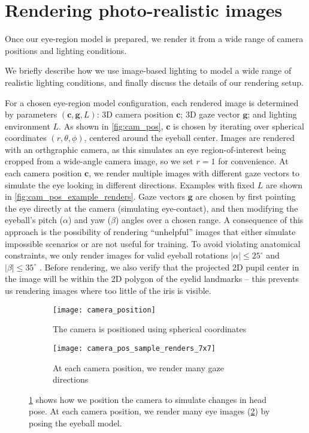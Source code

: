 
\section{Rendering photo-realistic images}

Once our eye-region model is prepared, we render it from a wide range of camera positions and lighting conditions.

We briefly describe how we use image-based lighting \cite{debevec2002image} to model a wide range of realistic lighting conditions, and finally discuss the details of our rendering setup.

For a chosen eye-region model configuration, each rendered image is determined by parameters $(\mathbf{c}, \mathbf{g}, L)$: 3D camera position $\mathbf{c}$; 3D gaze vector $\mathbf{g}$; and lighting environment $L$. As shown in \autoref{fig:cam_pos}, $\mathbf{c}$ is chosen by iterating over spherical coordinates $(r, \theta, \phi)$, centered around the eyeball center. Images are rendered with an orthgraphic camera, as this simulates an eye region-of-interest being cropped from a wide-angle camera image, so we set $r\!=\!1$ for convenience. At each camera position $\mathbf{c}$, we render multiple images with different gaze vectors to simulate the eye looking in different directions. Examples with fixed $L$ are shown in \autoref{fig:cam_pos_example_renders}. Gaze vectors $\mathbf{g}$ are chosen by first pointing the eye directly at the camera (simulating eye-contact), and then modifying the eyeball's pitch ($\alpha$) and yaw ($\beta$) angles over a chosen range.
%
A consequence of this approach is the possibility of rendering ``unhelpful'' images that either simulate impossible scenarios or are not useful for training. To avoid violating anatomical constraints, we only render images for valid eyeball rotations $|\alpha|\!\leq\!25^{\circ}$ and $|\beta|\!\leq\!35^{\circ}$ \cite{MIL-STD-1472G}. Before rendering, we also verify that the projected 2D pupil center in the image will be within the 2D polygon of the eyelid landmarks -- this prevents us rendering images where too little of the iris is visible.

\begin{figure}
    \centering
    \begin{subfigure}[t]{0.48\columnwidth}
        \texttt{[image: camera\_position]}
        \caption{The camera is positioned using spherical coordinates}
        \label{fig:cam_pos_spher_coords}
    \end{subfigure}
    \hfill
    \begin{subfigure}[t]{0.48\columnwidth}
        \texttt{[image: camera\_pos\_sample\_renders\_7x7]}
        \caption{At each camera position, we render many gaze directions}
        \label{fig:cam_pos_example_renders}
    \end{subfigure}
    \caption{\ref{fig:cam_pos_spher_coords} shows how we position the camera to simulate changes in head pose. At each camera position, we render many eye images (\ref{fig:cam_pos_example_renders}) by posing the eyeball model.}
    \label{fig:cam_pos}
\end{figure}

